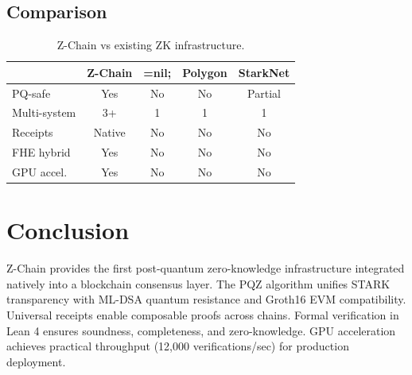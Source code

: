 \documentclass[11pt,a4paper]{article}
\begin{document}
\subsection{Comparison}

\begin{table}[h]
\centering
\begin{tabular}{lcccc}
\toprule
& \textbf{Z-Chain} & \textbf{=nil;} & \textbf{Polygon} & \textbf{StarkNet} \\
\midrule
PQ-safe & Yes & No & No & Partial \\
Multi-system & 3+ & 1 & 1 & 1 \\
Receipts & Native & No & No & No \\
FHE hybrid & Yes & No & No & No \\
GPU accel. & Yes & No & No & No \\
\bottomrule
\end{tabular}
\caption{Z-Chain vs existing ZK infrastructure.}
\end{table}

\section{Conclusion}

Z-Chain provides the first post-quantum zero-knowledge infrastructure integrated natively into a blockchain consensus layer. The PQZ algorithm unifies STARK transparency with ML-DSA quantum resistance and Groth16 EVM compatibility. Universal receipts enable composable proofs across chains. Formal verification in Lean 4 ensures soundness, completeness, and zero-knowledge. GPU acceleration achieves practical throughput (12,000 verifications/sec) for production deployment.
\end{document}
